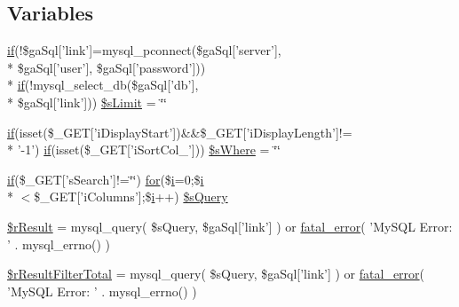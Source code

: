 \subsection*{Variables}
\begin{DoxyCompactItemize}
\item 
\hyperlink{fullpage_2plugin_8js_a8b98017e64ef036adb9ae327ff94abe1}{if}(!\$ga\+Sql\mbox{[}'link'\mbox{]}=mysql\+\_\+pconnect(\$ga\+Sql\mbox{[}'server'\mbox{]}, \\*
\$ga\+Sql\mbox{[}'user'\mbox{]}, \$ga\+Sql\mbox{[}'password'\mbox{]})) \\*
\hyperlink{fullpage_2plugin_8js_a8b98017e64ef036adb9ae327ff94abe1}{if}(!mysql\+\_\+select\+\_\+db(\$ga\+Sql\mbox{[}'db'\mbox{]}, \\*
\$ga\+Sql\mbox{[}'link'\mbox{]})) \hyperlink{filter__col_8php_a867f070c3b4e597275c622aac60de587}{\$s\+Limit} = \char`\"{}\char`\"{}
\item 
\hyperlink{fullpage_2plugin_8js_a8b98017e64ef036adb9ae327ff94abe1}{if}(isset(\$\+\_\+\+G\+E\+T\mbox{[}'i\+Display\+Start'\mbox{]})\&\&\$\+\_\+\+G\+E\+T\mbox{[}'i\+Display\+Length'\mbox{]}!= \\*
'-\/1') \hyperlink{fullpage_2plugin_8js_a8b98017e64ef036adb9ae327ff94abe1}{if}(isset(\$\+\_\+\+G\+E\+T\mbox{[}'i\+Sort\+Col\+\_'\mbox{]})) \hyperlink{filter__col_8php_a0b808cfb42dd8c187a9a8c95ddc50c1b}{\$s\+Where} = \char`\"{}\char`\"{}
\item 
\hyperlink{fullpage_2plugin_8js_a8b98017e64ef036adb9ae327ff94abe1}{if}(\$\+\_\+\+G\+E\+T\mbox{[}'s\+Search'\mbox{]}!=\char`\"{}\char`\"{}) \hyperlink{tinymce_8jquery_8dev_8js_a4675a875b20881bc5f7011f49fbd4da7}{for}(\$\hyperlink{validate_8js_a5e25b1d1bed9ab5f3174b76d6a722180}{i}=0;\$\hyperlink{validate_8js_a5e25b1d1bed9ab5f3174b76d6a722180}{i}\\*
$<$\$\+\_\+\+G\+E\+T\mbox{[}'i\+Columns'\mbox{]};\$\hyperlink{validate_8js_a5e25b1d1bed9ab5f3174b76d6a722180}{i}++) \hyperlink{filter__col_8php_a5175d5486118502db3f7aa1ccf7029cc}{\$s\+Query}
\item 
\hyperlink{filter__col_8php_a8f423fcb1764890d70da997a4140f703}{\$r\+Result} = mysql\+\_\+query( \$s\+Query, \$ga\+Sql\mbox{[}'link'\mbox{]} ) or \hyperlink{examples_2server__side_2scripts_2server__processing_8php_a1bb235f2e57f0389e14b11592d32119a}{fatal\+\_\+error}( 'My\+S\+Q\+L Error\+: ' . mysql\+\_\+errno() )
\item 
\hyperlink{filter__col_8php_a29b3b8a9782e4c5b8157be2ba70a33e1}{\$r\+Result\+Filter\+Total} = mysql\+\_\+query( \$s\+Query, \$ga\+Sql\mbox{[}'link'\mbox{]} ) or \hyperlink{examples_2server__side_2scripts_2server__processing_8php_a1bb235f2e57f0389e14b11592d32119a}{fatal\+\_\+error}( 'My\+S\+Q\+L Error\+: ' . mysql\+\_\+errno() )

\end{DoxyCompactItemize}
